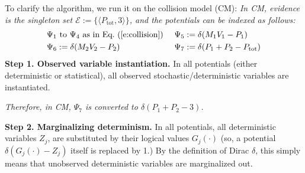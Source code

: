 \documentclass[]{article}
\newcommand{\tuple}[1] {\langle #1 \rangle}
\newcommand{\pr}{p}
\begin{document}

To clarify the algorithm, we run it on the collision model (CM): 
\emph{In CM, evidence is the singleton set {\footnotesize$\mathcal{E} := \{\tuple{P_\text{tot}, 3}\}$}, and 
the potentials can be indexed as follows: 
\begin{align*}
& \Psi_1 \text{ to } \Psi_4 \text{ as in Eq.~(\ref{e:collision}) } &&\Psi_5 := \delta(M_1V_1 - P_1)\\
&\Psi_6 := \delta(M_2V_2 - P_2)		&& \Psi_7 := \delta(P_1 + P_2 - P_\text{tot})   
\end{align*}
}
{\bf \!\!Step 1. Observed variable instantiation.} 
In all potentials (either deterministic or statistical), all observed stochastic/deterministic 
variables are instantiated. 

\emph{Therefore, in CM, 
{\footnotesize$\Psi_{7}$} is converted to 
{\footnotesize$\delta(P_1 + P_2 - 3)$}.} %

{\bf Step 2. Marginalizing determinism.}
In all potentials, all deterministic variables $Z_j$, are 
substituted by their 
logical values $G_j(\cdot)$ (so, a potential $\delta ( G_j(\cdot) - Z_j)$ itself is replaced by 1.) By the definition of Dirac $\delta$, this simply means that  unobserved deterministic variables are marginalized out.
\end{document}
